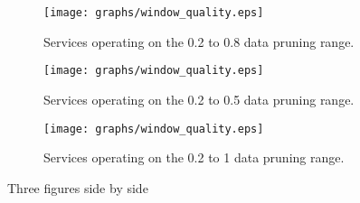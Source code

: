 \begin{figure*}[ht]
  \centering

  \begin{subfigure}[b]{\textwidth}
    \centering
    \texttt{[image: graphs/window\_quality.eps]}

    \caption{Services operating on the 0.2 to 0.8 data pruning range.}
    \label{fig:windows_quality_good}
  \end{subfigure}
  \hfill %

  \begin{subfigure}[b]{\textwidth}
    \centering
    \texttt{[image: graphs/window\_quality.eps]}

    \caption{Services operating on the 0.2 to 0.5 data pruning range.}
    \label{fig:second}
  \end{subfigure}
  \hfill %

  \begin{subfigure}[b]{\textwidth}
    \centering
    \texttt{[image: graphs/window\_quality.eps]}

    \caption{Services operating on the 0.2 to 1 data pruning range.}
    \label{fig:third}
  \end{subfigure}

  \caption{Three figures side by side}
  \label{fig:quality_window}

\end{figure*}
